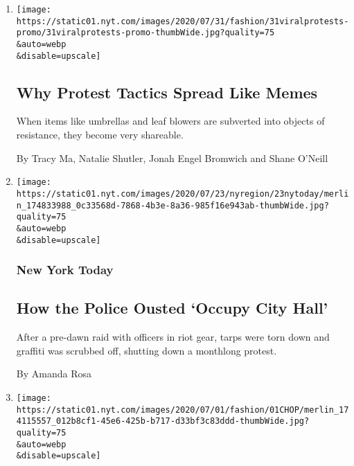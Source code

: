 \begin{enumerate}
\def\labelenumi{\arabic{enumi}.}
\item
  \href{/2020/07/31/style/viral-protest-videos.html}{}

  \texttt{[image: https://static01.nyt.com/images/2020/07/31/fashion/31viralprotests-promo/31viralprotests-promo-thumbWide.jpg?quality=75\\\&auto=webp\\\&disable=upscale]}

  \hypertarget{why-protest-tactics-spread-like-memes}{%
  \subsection{Why Protest Tactics Spread Like
  Memes}\label{why-protest-tactics-spread-like-memes}}

  When items like umbrellas and leaf blowers are subverted into objects
  of resistance, they become very shareable.

  By Tracy Ma, Natalie Shutler, Jonah Engel Bromwich and Shane O'Neill
\item
  \href{/2020/07/23/nyregion/occupy-city-hall-nyc.html}{}

  \texttt{[image: https://static01.nyt.com/images/2020/07/23/nyregion/23nytoday/merlin\_174833988\_0c33568d-7868-4b3e-8a36-985f16e943ab-thumbWide.jpg?quality=75\\\&auto=webp\\\&disable=upscale]}

  \hypertarget{new-york-today}{%
  \subsubsection{New York Today}\label{new-york-today}}

  \hypertarget{how-the-police-ousted-occupy-city-hall}{%
  \subsection{How the Police Ousted `Occupy City
  Hall'}\label{how-the-police-ousted-occupy-city-hall}}

  After a pre-dawn raid with officers in riot gear, tarps were torn down
  and graffiti was scrubbed off, shutting down a monthlong protest.

  By Amanda Rosa
\item
  \href{/2020/07/01/style/autonomous-zone-anarchist-community.html}{}

  \texttt{[image: https://static01.nyt.com/images/2020/07/01/fashion/01CHOP/merlin\_174115557\_012b8cf1-45e6-425b-b717-d33bf3c83ddd-thumbWide.jpg?quality=75\\\&auto=webp\\\&disable=upscale]}


\end{enumerate}
